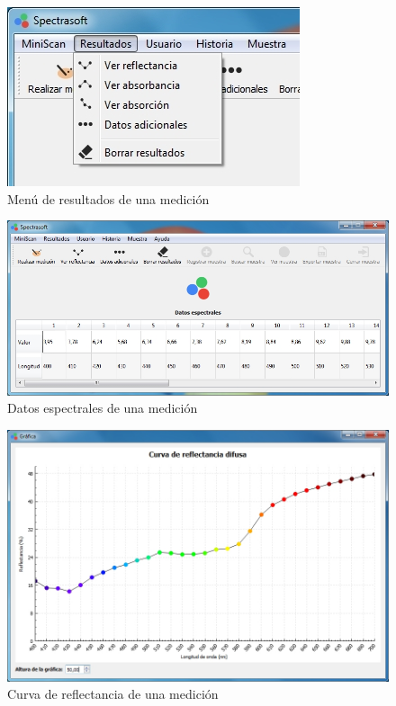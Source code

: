 \begin{figure}[H]
  \centering
  \includegraphics[width=.5\linewidth]{./img/resultados-menu.jpg}
\caption[]{Men\'{u} de resultados de una medici\'{o}n\label{fig:menu-resultados}}
\end{figure}
\newpage
\null
\vfill
\begin{figure}[H]
  \centering
  \includegraphics[width=1\linewidth]{./img/resultados.jpg}
\caption[]{Datos espectrales de una medici\'{o}n\label{fig:datos-espectrales}}
\end{figure}
\vfill
\begin{figure}[H]
  \centering
  \includegraphics[width=1\linewidth]{./img/resultados-reflectancia.jpg}
\caption[]{Curva de reflectancia de una medici\'{o}n\label{fig:resultados-reflectancia}}
\end{figure}
